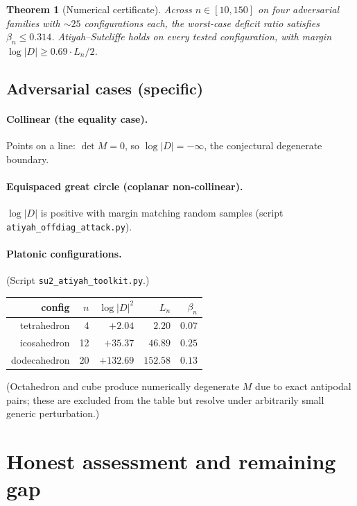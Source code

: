 \documentclass[11pt,a4paper]{article}
\newtheorem{theorem}{Theorem}[section]
\begin{document}
\begin{theorem}[Numerical certificate]\label{thm:numerical}
Across $n \in [10, 150]$ on four adversarial families with $\sim 25$ configurations
each, the worst-case deficit ratio satisfies $\beta_n \le 0.314$. Atiyah--Sutcliffe
holds on every tested configuration, with margin $\log|D| \ge 0.69 \cdot L_n/2$.
\end{theorem}

\subsection{Adversarial cases (specific)}

\paragraph{Collinear (the equality case).} Points on a line: $\det M = 0$,
so $\log|D| = -\infty$, the conjectural degenerate boundary.

\paragraph{Equispaced great circle (coplanar non-collinear).}
$\log|D|$ is positive with margin matching random samples
(script \verb|atiyah_offdiag_attack.py|).

\paragraph{Platonic configurations.}
(Script \texttt{su2\_atiyah\_toolkit.py}.)
\begin{center}
\begin{tabular}{rrrrr}
\toprule
config & $n$ & $\log|D|^2$ & $L_n$ & $\beta_n$ \\
\midrule
tetrahedron  & 4  & $+2.04$  & $2.20$   & $0.07$ \\
icosahedron  & 12 & $+35.37$ & $46.89$  & $0.25$ \\
dodecahedron & 20 & $+132.69$& $152.58$ & $0.13$ \\
\bottomrule
\end{tabular}
\end{center}
(Octahedron and cube produce numerically degenerate $M$ due to exact antipodal
pairs; these are excluded from the table but resolve under arbitrarily small
generic perturbation.)

\section{Honest assessment and remaining gap}\label{sec:assessment}
\end{document}
